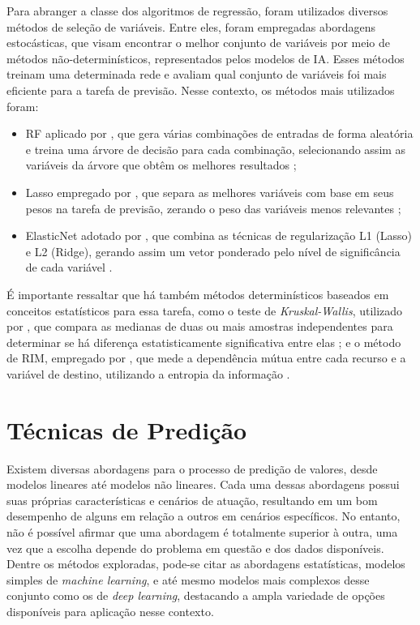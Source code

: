 Para abranger a classe dos algoritmos de regressão, foram utilizados diversos métodos de seleção de variáveis. Entre eles, foram empregadas abordagens estocásticas, que visam encontrar o melhor conjunto de variáveis por meio de métodos não-determinísticos, representados pelos modelos de IA. Esses métodos treinam uma determinada rede e avaliam qual conjunto de variáveis foi mais eficiente para a tarefa de previsão. Nesse contexto, os métodos mais utilizados foram: 
\begin{itemize}
    \item \ac{RF} aplicado por , que gera várias combinações de entradas de forma aleatória e treina uma árvore de decisão para cada combinação, selecionando assim as variáveis da árvore que obtêm os melhores resultados \cite{breiman2001random}; 
    \item Lasso empregado por , que separa as melhores variáveis com base em seus pesos na tarefa de previsão, zerando o peso das variáveis menos relevantes \cite{muthukrishnan2016lasso}; 
    \item ElasticNet adotado por , que combina as técnicas de regularização L1 (Lasso) e L2 (Ridge), gerando assim um vetor ponderado pelo nível de significância de cada variável \cite{amini2021two}.
\end{itemize}
É importante ressaltar que há também métodos determinísticos baseados em conceitos estatísticos para essa tarefa, como o teste de \textit{Kruskal-Wallis}, utilizado por , que compara as medianas de duas ou mais amostras independentes para determinar se há diferença estatisticamente significativa entre elas \cite{kruskal1952use}; e o método de \ac{RIM}, empregado por , que mede a dependência mútua entre cada recurso e a variável de destino, utilizando a entropia da informação \cite{kraskov2004estimating}.

\section{Técnicas de Predição}
\label{subsec:tecnicas_predicao}
Existem diversas abordagens para o processo de predição de valores, desde modelos lineares até modelos não lineares. Cada uma dessas abordagens possui suas próprias características e cenários de atuação, resultando em um bom desempenho de alguns em relação a outros em cenários específicos. No entanto, não é possível afirmar que uma abordagem é totalmente superior à outra, uma vez que a escolha depende do problema em questão e dos dados disponíveis. Dentre os métodos exploradas, pode-se citar as abordagens estatísticas, modelos simples de \textit{machine learning}, e até mesmo modelos mais complexos desse conjunto como os de \textit{deep learning}, destacando a ampla variedade de opções disponíveis para aplicação nesse contexto.

